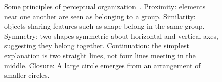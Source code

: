 \begin{figure}
\centering
  \hspace{2mm}
  \hspace{2mm}
  \hspace{2mm}
  \hspace{2mm}

\caption[Gestalt perceptual organization]{Some principles of
  perceptual organization~\cite{kanizsa-gestalt}.
   Proximity: elements near one another
  are seen as belonging to a group. 
  Similarity: objects sharing features such as shape belong in the
  same group.  Symmetry: two shapes
  symmetric about horizontal and vertical axes, suggesting they belong
  together.  Continuation: the
  simplest explanation is two straight lines, not four lines meeting
  in the middle.  Closure: A large circle
  emerges from an arrangement of smaller circles.}
\label{fig:gestalt}
\end{figure}
